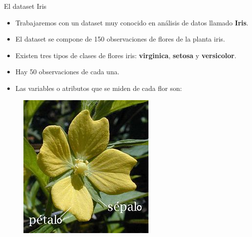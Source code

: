 \documentclass[handout]{beamer}
\begin{document}
\begin{frame}{El dataset Iris}
\scriptsize{
\begin{itemize}
 \item Trabajaremos con un dataset muy conocido en análisis de datos llamado \textbf{Iris}.
 \item El dataset se compone de 150 observaciones de flores de la planta iris. 
 \item Existen tres tipos de clases de flores iris: \textbf{virginica}, \textbf{setosa} y \textbf{versicolor}.
 \item Hay 50 observaciones de cada una.
\item Las variables o atributos que se miden de cada flor son:


 
\end{itemize}


\begin{figure}[h!]
	\centering
	\includegraphics[scale=1.2]{pics/petalosepalo.jpg}
	
	
\end{figure}

}

\end{frame}
\end{document}
